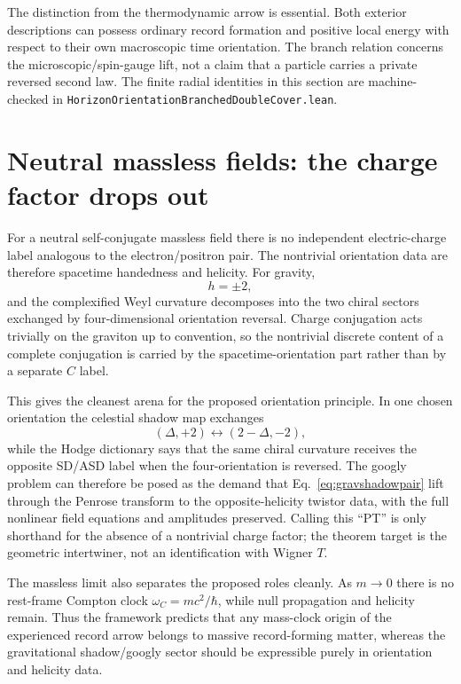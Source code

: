 \documentclass[11pt]{article}
\theoremstyle{definition}\newtheorem{definition}[theorem]{Definition}
\theoremstyle{remark}\newtheorem{remark}[theorem]{Remark}\newtheorem{conjecture}[theorem]{Conjecture}
\begin{document}
The distinction from the thermodynamic arrow is essential. Both exterior descriptions can possess ordinary record formation and positive local energy with respect to their own macroscopic time orientation. The branch relation concerns the microscopic/spin-gauge lift, not a claim that a particle carries a private reversed second law. The finite radial identities in this section are machine-checked in \texttt{HorizonOrientationBranchedDoubleCover.lean}.

\section{Neutral massless fields: the charge factor drops out}
For a neutral self-conjugate massless field there is no independent electric-charge label analogous to the electron/positron pair. The nontrivial orientation data are therefore spacetime handedness and helicity. For gravity,
\begin{equation}
 h=\pm2,
\end{equation}
and the complexified Weyl curvature decomposes into the two chiral sectors exchanged by four-dimensional orientation reversal. Charge conjugation acts trivially on the graviton up to convention, so the nontrivial discrete content of a complete conjugation is carried by the spacetime-orientation part rather than by a separate $C$ label.

This gives the cleanest arena for the proposed orientation principle. In one chosen orientation the celestial shadow map exchanges
\begin{equation}\label{eq:gravshadowpair}
 (\Delta,+2)\longleftrightarrow(2-\Delta,-2),
\end{equation}
while the Hodge dictionary says that the same chiral curvature receives the opposite SD/ASD label when the four-orientation is reversed. The googly problem can therefore be posed as the demand that Eq.~\eqref{eq:gravshadowpair} lift through the Penrose transform to the opposite-helicity twistor data, with the full nonlinear field equations and amplitudes preserved. Calling this ``PT'' is only shorthand for the absence of a nontrivial charge factor; the theorem target is the geometric intertwiner, not an identification with Wigner $T$.

The massless limit also separates the proposed roles cleanly. As $m\to0$ there is no rest-frame Compton clock $\omega_C=mc^2/\hbar$, while null propagation and helicity remain. Thus the framework predicts that any mass-clock origin of the experienced record arrow belongs to massive record-forming matter, whereas the gravitational shadow/googly sector should be expressible purely in orientation and helicity data.
\end{document}

